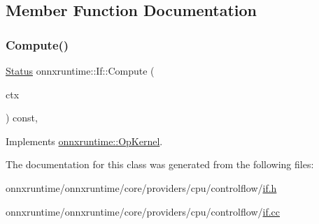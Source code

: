 \subsection{Member Function Documentation}
\mbox{\label{classonnxruntime_1_1If_adbe75a2696664bc47d3ea2b88cb4bd63}} 
\subsubsection{\texorpdfstring{Compute()}{Compute()}}
{\footnotesize\ttfamily \mbox{\hyperlink{classonnxruntime_1_1common_1_1Status}{Status}} onnxruntime\+::\+If\+::\+Compute (\begin{DoxyParamCaption}\item[{\mbox{\hyperlink{classonnxruntime_1_1OpKernelContext}{Op\+Kernel\+Context}} $\ast$}]{ctx }\end{DoxyParamCaption}) const\hspace{0.3cm}{\ttfamily [override]}, {\ttfamily [virtual]}}



Implements \mbox{\hyperlink{classonnxruntime_1_1OpKernel_a9eca8656a78b1b3ab9d3351a12798650}{onnxruntime\+::\+Op\+Kernel}}.



The documentation for this class was generated from the following files\+:\begin{DoxyCompactItemize}
\item 
onnxruntime/onnxruntime/core/providers/cpu/controlflow/\mbox{\hyperlink{if_8h}{if.\+h}}\item 
onnxruntime/onnxruntime/core/providers/cpu/controlflow/\mbox{\hyperlink{if_8cc}{if.\+cc}}\end{DoxyCompactItemize}

